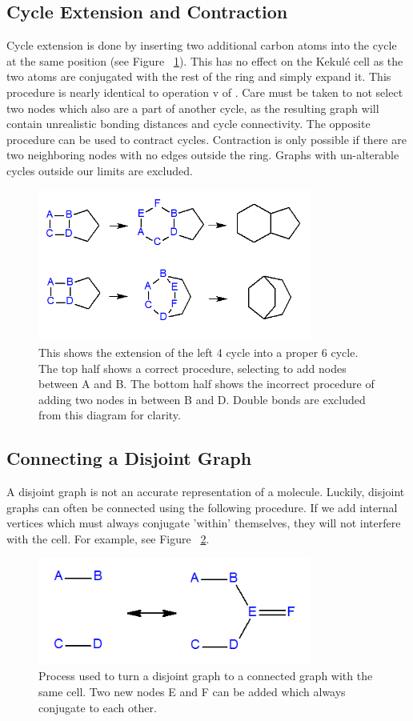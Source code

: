 \documentclass[12pt]{article}
\begin{document}
\subsection{Cycle Extension and Contraction}
Cycle extension is done by inserting two additional carbon atoms into the cycle at the same position (see Figure ~\ref{fig:cycleExtension}). This has no effect on the Kekul\'e cell as the two atoms are conjugated with the rest of the ring and simply expand it. This procedure is nearly identical to operation v of \cite{v06}. Care must be taken to not select two nodes which also are a part of another cycle, as the resulting graph will contain unrealistic bonding distances and cycle connectivity. The opposite procedure can be used to contract cycles. Contraction is only possible if there are two neighboring nodes with no edges outside the ring. Graphs with un-alterable cycles outside our limits are excluded.

\begin{figure}[ht!]
\centering
\includegraphics[width=90mm]{cycleExtension.png}
\caption{This shows the extension of the left 4 cycle into a proper 6 cycle. The top half shows a correct procedure, selecting to add nodes between A and B. The bottom half shows the incorrect procedure of adding two nodes in between B and D. Double bonds are excluded from this diagram for clarity.}
\label{fig:cycleExtension}
\end{figure}

\subsection{Connecting a Disjoint Graph}
A disjoint graph is not an accurate representation of a molecule. Luckily, disjoint graphs can often be connected using the following procedure. If we add internal vertices which must always conjugate ’within’ themselves, they will not interfere with the cell. For example, see Figure ~\ref{fig:disjoint}.

\begin{figure}[ht!]
\centering
\includegraphics[width=90mm]{disjoint2.png}
\caption{Process used to turn a disjoint graph to a connected graph with the same cell. Two new nodes E and F can be added which always conjugate to each other.}
\label{fig:disjoint}
\end{figure}
\end{document}
